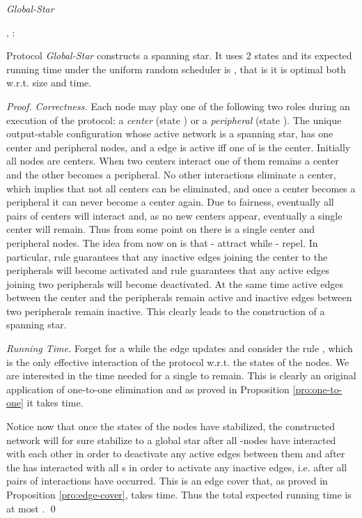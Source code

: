 \documentclass[oribibl, 11pt]{llncs}
\begin{document}
\renewcommand{\algorithmiccomment}[1]{// #1}
\begin{algorithm}[!h]
  \caption{\emph{Global-Star}}\label{prot:gstar}
  \begin{algorithmic}
    \medskip
    \State , 
    \State : 
    
  \end{algorithmic}
\end{algorithm}

\begin{theorem}
Protocol \emph{Global-Star} constructs a spanning star. It uses 2 states and its expected running time under the uniform random scheduler is , that is it is optimal both w.r.t. size and time.
\end{theorem}
\begin{proof}
\emph{Correctness.} Each node may play one of the following two roles during an execution of the protocol: a \emph{center} (state ) or a \emph{peripheral} (state ). The unique output-stable configuration  whose active network is a spanning star, has one center and  peripheral nodes, and a  edge is active iff one of  is the center. Initially all nodes are centers. When two centers interact one of them remains a center and the other becomes a peripheral. No other interactions eliminate a center, which implies that not all centers can be eliminated, and once a center becomes a peripheral it can never become a center again. Due to fairness, eventually all pairs of centers will interact and, as no new centers appear, eventually a single center will remain. Thus from some point on there is a single center and  peripheral nodes. The idea from now on is that - attract while - repel. In particular, rule  guarantees that any inactive edges joining the center to the peripherals will become activated and rule  guarantees that any active edges joining two peripherals will become deactivated. At the same time active edges between the center and the peripherals remain active and inactive edges between two peripherals remain inactive. This clearly leads to the construction of a spanning star.

\emph{Running Time.} Forget for a while the edge updates and consider the rule , which is the only effective interaction of the protocol w.r.t. the states of the nodes. We are interested in the time needed for a single  to remain. This is clearly an original application of one-to-one elimination and as proved in Proposition \ref{pro:one-to-one} it takes  time.

Notice now that once the states of the nodes have stabilized, the constructed network will for sure stabilize to a global star after all -nodes have interacted with each other in order to deactivate any active edges between them and after the  has interacted with all s in order to activate any inactive edges, i.e. after all pairs of interactions have occurred. This is an edge cover that, as proved in Proposition \ref{pro:edge-cover}, takes  time. Thus the total expected running time is at most .
\qed
\end{proof}
\end{document}
